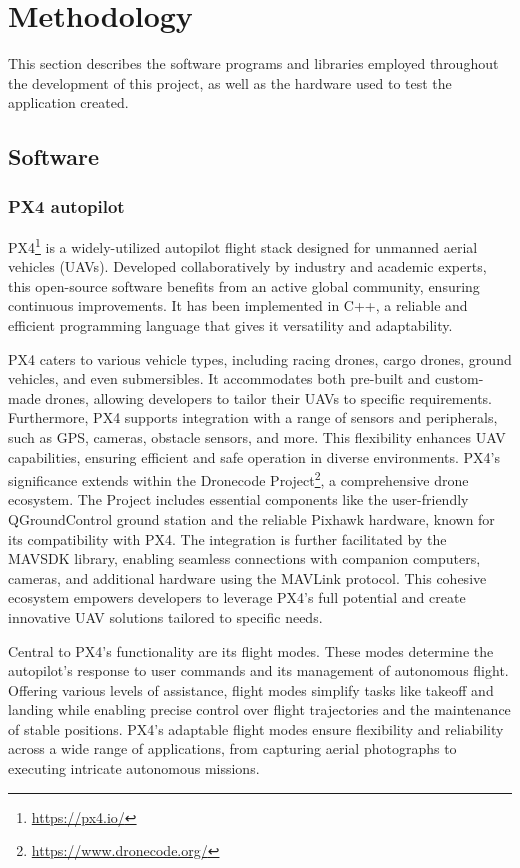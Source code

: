 \section{Methodology}

This section describes the software programs and libraries employed throughout the development of this project, as well as the hardware used to test the application created.

\subsection{Software}

\subsubsection{PX4 autopilot}
\label{subsec:px4}

PX4\footnote{\url{https://px4.io/}} is a widely-utilized autopilot flight stack designed for unmanned aerial vehicles (UAVs). Developed collaboratively by industry and academic experts, this open-source software benefits from an active global community, ensuring continuous improvements. It has been implemented in C++, a reliable and efficient programming language that gives it versatility and adaptability.

PX4 caters to various vehicle types, including racing drones, cargo drones, ground vehicles, and even submersibles. It accommodates both pre-built and custom-made drones, allowing developers to tailor their UAVs to specific requirements. Furthermore, PX4 supports integration with a range of sensors and peripherals, such as GPS, cameras, obstacle sensors, and more. This flexibility enhances UAV capabilities, ensuring efficient and safe operation in diverse environments.
PX4's significance extends within the Dronecode Project\footnote{\url{https://www.dronecode.org/}}, a comprehensive drone ecosystem. The Project includes essential components like the user-friendly QGroundControl ground station and the reliable Pixhawk hardware, known for its compatibility with PX4. The integration is further facilitated by the MAVSDK library, enabling seamless connections with companion computers, cameras, and additional hardware using the MAVLink protocol. This cohesive ecosystem empowers developers to leverage PX4's full potential and create innovative UAV solutions tailored to specific needs.

Central to PX4's functionality are its flight modes. These modes determine the autopilot's response to user commands and its management of autonomous flight. Offering various levels of assistance, flight modes simplify tasks like takeoff and landing while enabling precise control over flight trajectories and the maintenance of stable positions. PX4's adaptable flight modes ensure flexibility and reliability across a wide range of applications, from capturing aerial photographs to executing intricate autonomous missions.


